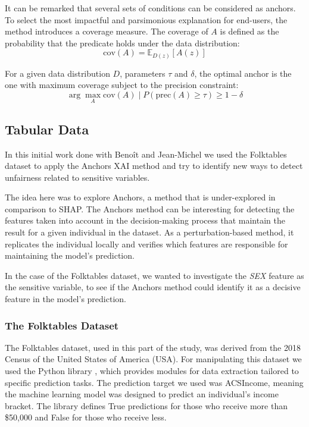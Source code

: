 It can be remarked that several sets of conditions can be considered as anchors. To select the most impactful and parsimonious explanation for end-users, the method introduces a coverage measure. The coverage of $A$ is defined as the probability that the predicate holds under the data distribution:
\begin{equation}
\text{cov}(A) = \mathbb{E}_{D(z)} [A(z)]
\label{eq:cov-anchors}
\end{equation}

For a given data distribution $D$, parameters $\tau$ and $\delta$, the optimal anchor is the one with maximum coverage subject to the precision constraint:
\begin{equation}
\arg \max_{A} {\text{cov}(A) \mid P(\text{prec}(A) \geq \tau) \geq 1 - \delta }
\label{eq:max-cov-anchors}
\end{equation}


\subsection{Tabular Data}
In this initial work done with Benoît and Jean-Michel we used the Folktables dataset \cite{folktables-ding} to apply the Anchors XAI method and try to identify new ways to detect unfairness related to sensitive variables.

The idea here was to explore Anchors, a method that is under-explored in comparison to SHAP. The Anchors method can be interesting for detecting the features taken into account in the decision-making process that maintain the result for a given individual in the dataset. As a perturbation-based method, it replicates the individual locally and verifies which features are responsible for maintaining the model's prediction.

In the case of the Folktables dataset, we wanted to investigate the \textit{SEX} feature as the sensitive variable, to see if the Anchors method could identify it as a decisive feature in the model's prediction.

\subsubsection{The Folktables Dataset}
The Folktables dataset, used in this part of the study, was derived from the 2018 Census of the United States of America (USA). For manipulating this dataset we used the Python library \cite{folktables}, which provides modules for data extraction tailored to specific prediction tasks. The prediction target we used was ACSIncome, meaning the machine learning model was designed to predict an individual's income bracket. The library defines True predictions for those who receive more than \$50,000 and False for those who receive less.

